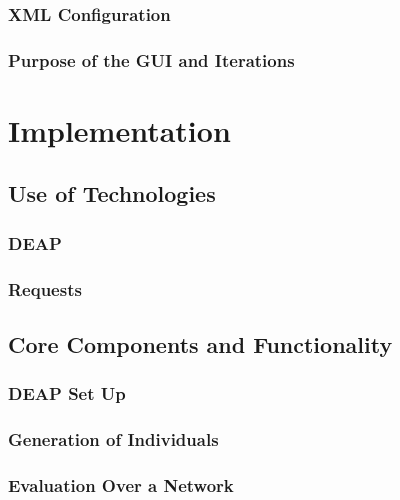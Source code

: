 \documentclass{l4proj}
\begin{document}
\subsection{XML Configuration}


\subsection{Purpose of the GUI and Iterations}



\chapter{Implementation}


\section{Use of Technologies}

\subsection{DEAP}


\subsection{Requests}


\section{Core Components and Functionality}

\subsection{DEAP Set Up}


\subsection{Generation of Individuals}


\subsection{Evaluation Over a Network}

\end{document}
